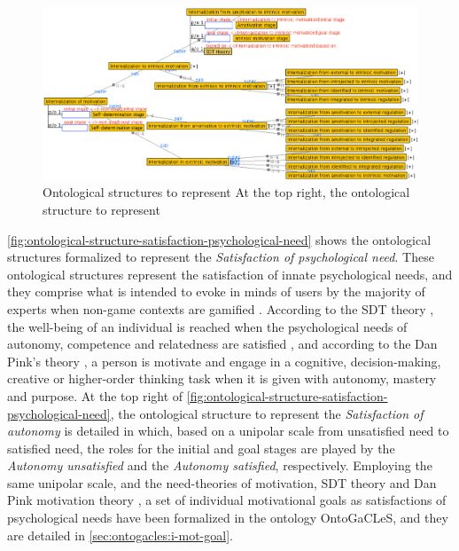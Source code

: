 \begin{figure}[!htbp]
 \caption[Ontological structures to represent satisfaction of psychological need]{Ontological structures to represent  At the top right, the ontological structure to represent }
 \label{fig:ontological-structure-satisfaction-psychological-need}
 \centering
 \includegraphics[width=1\textwidth]{images/chap-ontogacles1/ontological-structure-satisfaction-psychological-need.png}
 \fautor
\end{figure}

\autoref{fig:ontological-structure-satisfaction-psychological-need} shows the ontological structures formalized to represent the \emph{Satisfaction of psychological need}. These ontological structures represent the satisfaction of innate psychological needs, and they comprise what is intended to evoke in minds of users by the majority of experts when non-game contexts are gamified \cite{MoraRieraGonzalezArnedo-Moreno2015, SeabornFels2015}. According to the SDT theory \cite{RyanDeci2000,DeciRyan2010}, the well-being of an individual is reached when the psychological needs of autonomy, competence and relatedness are satisfied \cite{DeciRyan1985, DeciRyan2010}, and according to the Dan Pink's theory \cite{Pink2011}, a person is motivate and engage in a cognitive, decision-making, creative or higher-order thinking task when it is given with autonomy, mastery and purpose. At the top right of \autoref{fig:ontological-structure-satisfaction-psychological-need}, the ontological structure to represent the \emph{Satisfaction of autonomy} is detailed in which, based on a unipolar scale from unsatisfied need to satisfied need, the roles for the initial and goal stages are played by the \emph{Autonomy unsatisfied} and the \emph{Autonomy satisfied}, respectively. Employing the same unipolar scale, and the need-theories of motivation, SDT theory \cite{DeciRyan2010} and Dan Pink motivation theory \cite{Pink2011}, a set of individual motivational goals as satisfactions of psychological needs have been formalized in the ontology OntoGaCLeS, and they are detailed in \autoref{sec:ontogacles:i-mot-goal}.

